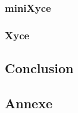 \documentclass[11pt,a4paper,oneside]{memoir}
\theoremstyle{definition}
\theoremstyle{remark}
\theoremstyle{plain}
\begin{document}


\subsection{miniXyce}


\subsection{Xyce}
























\begin{vplace}[0.5]

\chapter*{Conclusion}



\end{vplace}







\begin{vplace}
\chapter*{Annexe}


\end{vplace}




\nocite{*}


\end{document}
